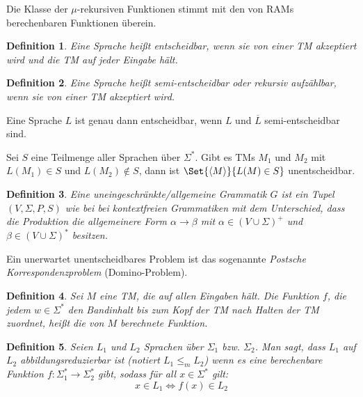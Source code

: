 \documentclass{cheat-sheet}
\newtheorem*{definition}{Definition}
\begin{document}
\begin{bem}
Die Klasse der $\mu$-rekursiven Funktionen stimmt mit den von RAMs berechenbaren Funktionen überein.
\end{bem}

\begin{definition}
Eine Sprache heißt \emph{entscheidbar}, wenn sie von einer TM akzeptiert wird und die TM auf jeder Eingabe hält.
\end{definition}

\begin{definition}
Eine Sprache heißt \emph{semi-entscheidbar} oder rekursiv aufzählbar, wenn sie von einer TM akzeptiert wird.
\end{definition}

\begin{satz}
Eine Sprache $L$ ist genau dann entscheidbar, wenn $L$ und $\overline{L}$ semi-entscheidbar sind.
\end{satz}

\begin{satz}
Sei $S$ eine Teilmenge aller Sprachen über $\Sigma^{*}$. Gibt es TMs $M_{1}$ und $M_{2}$ mit $L(M_{1}) \in S$ und $L(M_{2}) \not\in S$, dann ist $\Set{ \langle M \rangle }{ L(M) \in S }$ unentscheidbar.
\end{satz}

\begin{definition}
Eine \emph{uneingeschränkte/allgemeine Grammatik} $G$ ist ein Tupel $(V, \Sigma, P, S)$ wie bei bei kontextfreien Grammatiken mit dem Unterschied, dass die Produktion die allgemeinere Form $\alpha \longrightarrow \beta$ mit $\alpha \in (V \cup \Sigma)^{+}$ und $\beta \in (V \cup \Sigma)^{*}$ besitzen.
\end{definition}

\begin{bem}
Ein unerwartet unentscheidbares Problem ist das sogenannte \emph{Postsche Korrespondenzproblem} (Domino-Problem).
\end{bem}

\begin{definition}
Sei $M$ eine TM, die auf allen Eingaben hält. Die Funktion $f$, die jedem $w \in \Sigma^{*}$ den Bandinhalt bis zum Kopf der TM nach Halten der TM zuordnet, heißt die von $M$ \emph{berechnete Funktion}.
\end{definition}

\begin{definition}
Seien $L_{1}$ und $L_{2}$ Sprachen über $\Sigma_{1}$ bzw. $\Sigma_{2}$. Man sagt, dass $L_{1}$ auf $L_{2}$ \emph{abbildungsreduzierbar} ist (notiert $L_{1} \le_{m} L_{2}$) wenn es eine berechenbare Funktion $f : \Sigma_{1}^{*} \to \Sigma_{2}^{*}$ gibt, sodass für all $x \in \Sigma^{*}$ gilt:
  \[ x \in L_{1} \Leftrightarrow f(x) \in L_{2} \]
\end{definition}
\end{document}
